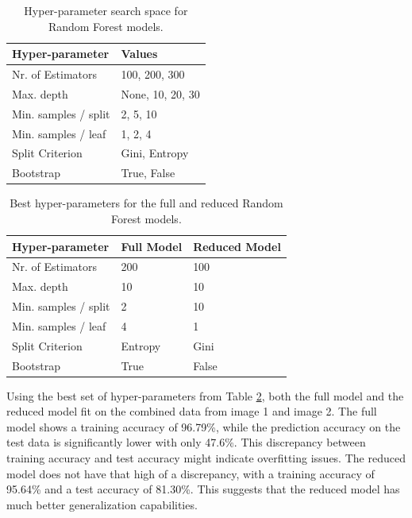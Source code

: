 \documentclass[11pt,letterpaper]{article}
\begin{document}
\begin{table}[]
\centering
\begin{tabular}{|l|l|}
\hline
\textbf{Hyper-parameter} & \textbf{Values}  \\ \hline
Nr. of Estimators       & 100, 200, 300    \\
Max. depth              & None, 10, 20, 30 \\
Min. samples / split    & 2, 5, 10         \\
Min. samples / leaf     & 1, 2, 4          \\
Split Criterion         & Gini, Entropy    \\
Bootstrap               & True, False      \\ \hline
\end{tabular}
\caption{Hyper-parameter search space for Random Forest models.}
\label{table:random_forest_hp_space}
\end{table}

\begin{table}[]
\centering
\begin{tabular}{|l|l|l|}
\hline
\textbf{Hyper-parameter} & \textbf{Full Model} & \textbf{Reduced Model} \\ \hline
Nr. of Estimators        & 200                 & 100                    \\
Max. depth               & 10                  & 10                     \\
Min. samples / split     & 2                   & 10                     \\
Min. samples / leaf      & 4                   & 1                      \\
Split Criterion          & Entropy             & Gini                   \\
Bootstrap                & True                & False                  \\ \hline
\end{tabular}
\caption{Best hyper-parameters for the full and reduced Random Forest models.}
\label{table:best_hp_random_forest}
\end{table}

Using the best set of hyper-parameters from Table \ref{table:best_hp_random_forest}, both the full model and the reduced model fit on the combined data from image 1 and image 2. The full model shows a training accuracy of 96.79\%, while the prediction accuracy on the test data is significantly lower with only 47.6\%. This discrepancy between training accuracy and test accuracy might indicate overfitting issues. The reduced model does not have that high of a discrepancy, with a training accuracy of 95.64\% and a test accuracy of 81.30\%. This suggests that the reduced model has much better generalization capabilities.
\end{document}

